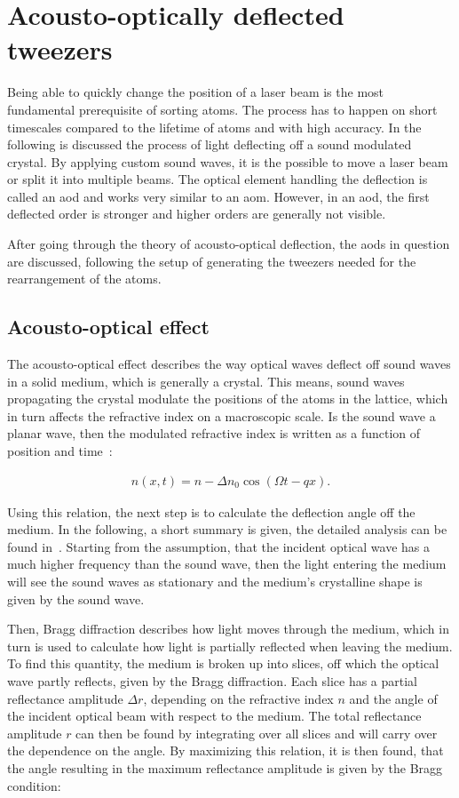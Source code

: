 \section{Acousto-optically deflected tweezers}

Being able to quickly change the position of a laser beam is the most fundamental prerequisite of sorting atoms. The process has to happen on short timescales compared to the lifetime of atoms and with high accuracy. In the following is discussed the process of light deflecting off a sound modulated crystal. By applying custom sound waves, it is the possible to move a laser beam or split it into multiple beams. The optical element handling the deflection is called an \ac{aod} and works very similar to an \ac{aom}. However, in an \ac{aod}, the first deflected order is stronger and higher orders are generally not visible.

After going through the theory of acousto-optical deflection, the \acp{aod} in question are discussed, following the setup of generating the tweezers needed for the rearrangement of the atoms.

\subsection{Acousto-optical effect}

The acousto-optical effect describes the way optical waves deflect off sound waves in a solid medium, which is generally a crystal. This means, sound waves propagating the crystal modulate the positions of the atoms in the lattice, which in turn affects the refractive index on a macroscopic scale. Is the sound wave a planar wave, then the modulated refractive index is written as a function of position and time~\cite{Saleh1991}:

\begin{align}
	n(x, t) = n - \Delta n_0 \cos{\left(\Omega t - q x\right)}.
\end{align}

Using this relation, the next step is to calculate the deflection angle off the medium. In the following, a short summary is given, the detailed analysis can be found in~\cite{Saleh1991}. Starting from the assumption, that the incident optical wave has a much higher frequency than the sound wave, then the light entering the medium will see the sound waves as stationary and the medium's crystalline shape is given by the sound wave.

Then, Bragg diffraction describes how light moves through the medium, which in turn is used to calculate how light is partially reflected when leaving the medium. To find this quantity, the medium is broken up into slices, off which the optical wave partly reflects, given by the Bragg diffraction. Each slice has a partial reflectance amplitude $\Delta r$, depending on the refractive index $n$ and the angle of the incident optical beam with respect to the medium. The total reflectance amplitude $r$ can then be found by integrating over all slices and will carry over the dependence on the angle. By maximizing this relation, it is then found, that the angle resulting in the maximum reflectance amplitude is given by the Bragg condition:

